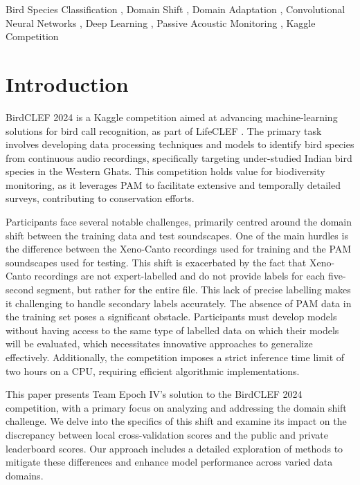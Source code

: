 \documentclass[
]{ceurart}
\begin{document}
\begin{keywords}
  Bird Species Classification \sep
  Domain Shift \sep
  Domain Adaptation \sep
  Convolutional Neural Networks \sep
  Deep Learning \sep
  Passive Acoustic Monitoring \sep
  Kaggle Competition
\end{keywords}

\maketitle

\section{Introduction} \label{introduction}

BirdCLEF 2024 \cite{birdclef2024} is a Kaggle competition aimed at advancing machine-learning solutions for bird call recognition, as part of LifeCLEF \cite{lifeclef2024}. The primary task involves developing data processing techniques and models to identify bird species from continuous audio recordings, specifically targeting under-studied Indian bird species in the Western Ghats. This competition holds value for biodiversity monitoring, as it leverages PAM to facilitate extensive and temporally detailed surveys, contributing to conservation efforts. 

Participants face several notable challenges, primarily centred around the domain shift between the training data and test soundscapes. One of the main hurdles is the difference between the Xeno-Canto recordings used for training and the PAM soundscapes used for testing. This shift is exacerbated by the fact that Xeno-Canto recordings are not expert-labelled and do not provide labels for each five-second segment, but rather for the entire file. This lack of precise labelling makes it challenging to handle secondary labels accurately. The absence of PAM data in the training set poses a significant obstacle. Participants must develop models without having access to the same type of labelled data on which their models will be evaluated, which necessitates innovative approaches to generalize effectively. Additionally, the competition imposes a strict inference time limit of two hours on a CPU, requiring efficient algorithmic implementations.

This paper presents Team Epoch IV's solution \cite{epoch2024identifying} to the BirdCLEF 2024 competition, with a primary focus on analyzing and addressing the domain shift challenge. We delve into the specifics of this shift and examine its impact on the discrepancy between local cross-validation scores and the public and private leaderboard scores. Our approach includes a detailed exploration of methods to mitigate these differences and enhance model performance across varied data domains.
\end{document}
